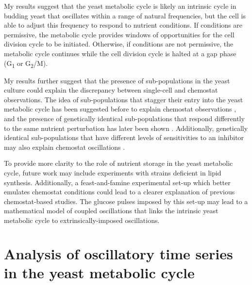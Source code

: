 My results suggest that the yeast metabolic cycle is likely an intrinsic cycle in budding yeast that oscillates within a range of natural frequencies, but the cell is able to adjust this frequency to respond to nutrient conditions.
If conditions are permissive, the metabolic cycle provides windows of opportunities for the cell division cycle to be initiated.
Otherwise, if conditions are not permissive, the metabolic cycle continues while the cell division cycle is halted at a gap phase (G\textsubscript{1} or G\textsubscript{2}/M).

My results further suggest that the presence of sub-populations in the yeast culture could explain the discrepancy between single-cell and chemostat observations.
The idea of sub-populations that stagger their entry into the yeast metabolic cycle has been suggested before to explain chemostat observations \parencite{burnettiCellCycleStart2016}, and the presence of genetically identical sub-populations that respond differently to the same nutrient perturbation has later been shown \parencite{bagameryPutativeBetHedgingStrategy2020}.
Additionally, genetically identical sub-populations that have different levels of sensitivities to an inhibitor may also explain chemostat oscillations \parencite{smithTheoryChemostatDynamics1995}.

To provide more clarity to the role of nutrient storage in the yeast metabolic cycle, future work may include experiments with strains deficient in lipid synthesis.
Additionally, a feast-and-famine experimental set-up which better emulates chemostat conditions could lead to a clearer explanation of previous chemostat-based studies.
The glucose pulses imposed by this set-up may lead to a mathematical model of coupled oscillations that links the intrinsic yeast metabolic cycle to extrinsically-imposed oscillations.


\section{Analysis of oscillatory time series in the yeast metabolic cycle}
\label{sec:concl-analysis}

